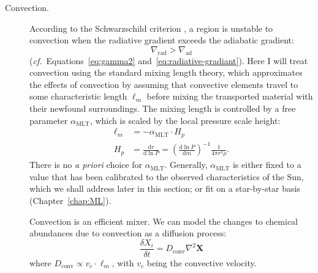 \begin{description}
    \item[Convection.] 
    According to the Schwarzschild criterion \citep[e.g.,][]{1958ses..book.....S}, a region is unstable to convection when the radiative gradient exceeds the adiabatic gradient: 
    \begin{equation}
        \nabla_{\text{rad}} 
        > 
        \nabla_{\text{ad}}
    \end{equation}
    (\emph{cf.}~Equations~\ref{eq:gamma2} and~\ref{eq:radiative-gradiant}). 
    Here I will treat convection using the standard \citet{1958ZA.....46..108B} mixing length theory, which approximates the effects of convection by assuming that convective elements travel to some characteristic length $\ell_m$ before mixing the transported material with their newfound surroundings. %
    The mixing length is controlled by a free parameter $\alpha_{\text{MLT}}$, which is scaled by the local pressure scale height: 
    \begin{align} \label{equation:MLT}
        \ell_m
        &=
        - \alpha_{\text{MLT}} \cdot H_p\\
        H_p
        &=
        \frac{\text{d}r}{\text{d} \ln P}
        =
        \left(
            \frac{\text{d} \ln P}{\text{d}m} 
        \right)^{-1}
        \frac{1}{4 \pi r^2 \rho}. 
    \end{align}
    There is no \emph{a priori} choice for $\alpha_{\text{MLT}}$. 
    Generally, $\alpha_{\text{MLT}}$ is either fixed to a value that has been calibrated to the observed characteristics of the Sun, which we shall address later in this section; or fit on a star-by-star basis (Chapter~\ref{chap:ML}). 
    
    Convection is an efficient mixer. %
    We can model the changes to chemical abundances due to convection as a diffusion process:
    \begin{equation} \boxed{
        \frac{\delta X_i}{\delta t}
        =
        D_{\text{conv}} \nabla^2 \mathbf{X}
    }\end{equation}
    where ${D_{\text{conv}} \propto v_c \cdot \ell_m}$, with $v_c$ being the convective velocity. 
    

\end{description}
